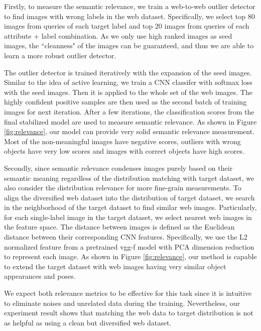 \documentclass[10pt,twocolumn,letterpaper]{article}
\begin{document}
Firstly, to measure the semantic relevance, we train a web-to-web outlier detector to find images with wrong labels in the web dataset. Specifically, we select top 80 images from queries of each target label and top 20 images from queries of each attribute + label combination. As we only use high ranked images as seed images, the ``cleanness" of the images can be guaranteed, and thus we are able to learn a more robust outlier detector. 

The outlier detector is trained iteratively with the expansion of the seed images. Similar to the idea of active learning, we train a CNN classifer with softmax loss with the seed images. Then it is applied to the whole set of the web images. The highly confident positive samples are then used as the second batch of training images for next iteration. After a few iterations, the classification scores from the final stabilized model are used to measure semantic relevance. As shown in Figure \ref{fig:relevance}, our model can provide very solid semantic relevance measurement. Most of the non-meaningful images have negative scores, outliers with wrong objects have very low scores and images with correct objects have high scores.

Secondly, since semantic relevance condenses images purely based on their semantic meaning regardless of the distribution matching with target dataset, we also consider the distribution relevance for more fine-grain measurements. To align the diversified web dataset into the distribution of target dataset, we search in the neighborhood of the target dataset to find similar web images. Particularly, for each single-label image in the target dataset, we select  nearest web images in the feature space. The distance between images is defined as the Euclidean distance between their corresponding CNN features. Specifically, we use the L2 normalized  feature from a pretrained vgg-f model with PCA dimension reduction to represent each image. As shown in Figure \ref{fig:relevance}, our method is capable to extend the target dataset with web images having very similar object appearances and poses.  



We expect both relevance metrics to be effective for this task since it is intuitive to eliminate noises and unrelated data during the training. Nevertheless, our experiment result shows that matching the web data to target distribution is not as helpful as using a clean but diversified web dataset.
\end{document}

